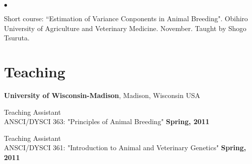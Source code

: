 \documentclass[margin,line,10pt]{res}
\newenvironment{list2}{
  \begin{list}{$\bullet$}{%
      \setlength{\itemsep}{0in}
      \setlength{\parsep}{0in} \setlength{\parskip}{0in}
      \setlength{\topsep}{0in} \setlength{\partopsep}{0in} 
      \setlength{\leftmargin}{0.2in}}}{\end{list}}
\begin{document}
\begin{resume}
\section{}
\begin{list2}
\item Short course: ``Estimation of Variance Conponents in Animal Breeding". Obihiro University of Agriculture and Veterinary Medicine. November. 
Taught by Shogo Tsuruta.  
\end{list2}  







\vspace{0.5cm}
\section{\sc Teaching}
{\bf University of Wisconsin-Madison}, Madison, Wisconsin USA 
\vspace{.01pt}

Teaching Assistant \\
ANSCI/DYSCI 363: "Principles of Animal Breeding"     \hfill {\bf Spring, 2011}


\vspace{.01pt}
Teaching Assistant \\
ANSCI/DYSCI 361: "Introduction to Animal and Veterinary Genetics"     \hfill {\bf Spring, 2011} 








\vspace{0.5cm}

\end{resume}
\end{document}
